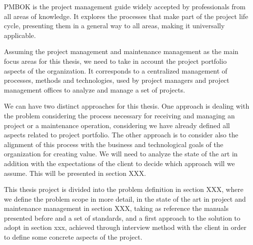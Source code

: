PMBOK is the project management guide widely accepted by professionals from all areas of knowledge. It explores the processes that make part of the project life cycle, presenting them in a general way to all areas, making it universally applicable.\par
Assuming the project management and maintenance management as the main focus areas for this thesis, we need to take in account the project portfolio aspects of the organization. It corresponds to a centralized management of processes, methods and technologies, used by project managers and project management offices to analyze and manage a set of projects.\par
We can have two distinct approaches for this thesis. One approach is dealing with the problem considering the process necessary for receiving and managing an project or a maintenance operation, considering we have already defined all aspects related to project portfolio. The other approach is to consider also the alignment of this process with the business and technological goals of the organization for creating value. We will need to analyze the state of the art in addition with the expectations of the client to decide which approach will we assume. This will be presented in section XXX.\par
This thesis project is divided into the problem definition in section XXX, where we define the problem scope in more detail, in the state of the art in project and maintenance management in section XXX, taking as reference the manuals presented before and a set of standards, and a first approach to the solution to adopt in section xxx,  achieved through interview method with the client in order to define some concrete aspects of the project.
